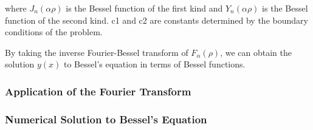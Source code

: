where \(J_n(\alpha\rho)\) is the Bessel function of the first kind and \(Y_n(\alpha\rho)\) is the Bessel function of the second kind. c1 and c2 are constants determined by the boundary conditions of the problem.

By taking the inverse Fourier-Bessel transform of \(F_\alpha(\rho)\), we can obtain the solution \(y(x)\) to Bessel's equation in terms of Bessel functions.

\subsubsection{Application of the Fourier Transform}

\subsubsection{Numerical Solution to Bessel's Equation}

